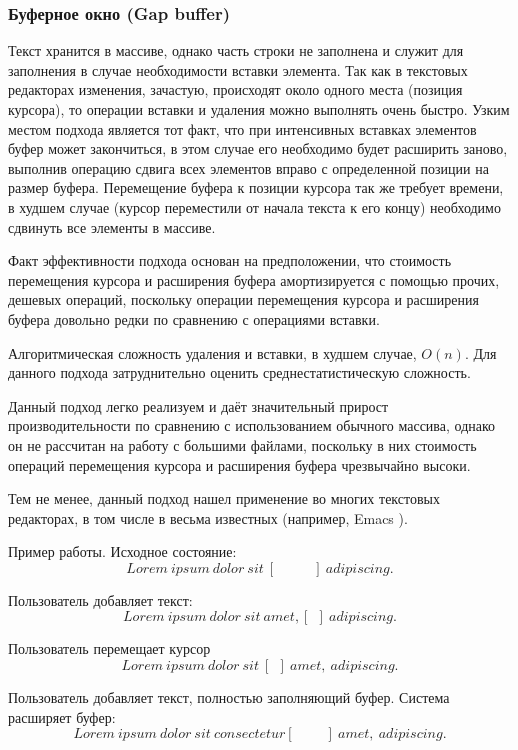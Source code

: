 \documentclass{fefu}
\begin{document}
			\subsubsection{Буферное окно (Gap buffer)}
				\par Текст хранится в массиве, однако часть строки не заполнена и служит для
				заполнения в случае необходимости вставки элемента. Так как в текстовых
				редакторах изменения, зачастую, происходят около одного места (позиция 
				курсора), то операции вставки и удаления можно выполнять очень быстро.
				Узким местом подхода является тот факт, что при интенсивных вставках элементов
				буфер может закончиться, в этом случае его необходимо будет расширить заново,
				выполнив операцию сдвига всех элементов вправо с определенной позиции на размер
				буфера. Перемещение буфера к позиции курсора так же требует времени, в худшем 
				случае (курсор переместили от начала текста к его концу) необходимо сдвинуть
				все элементы в массиве.
				\par Факт эффективности подхода основан на предположении, что стоимость
				перемещения курсора и расширения буфера амортизируется с помощью прочих,
				дешевых операций, поскольку операции перемещения курсора и расширения буфера
				довольно редки по сравнению с операциями вставки.
				\par Алгоритмическая сложность удаления и вставки, в худшем случае, $O(n)$. Для
				данного подхода затруднительно оценить среднестатистическую сложность.
				\par Данный подход легко реализуем и даёт значительный прирост
				производительности по сравнению с использованием обычного массива, однако он не
				рассчитан на работу с большими файлами, поскольку в них стоимость операций 
				перемещения курсора и расширения буфера чрезвычайно высоки.
				\par Тем не менее, данный подход нашел применение во многих текстовых
				редакторах, в том числе в весьма известных (например, Emacs
				\cite{EmacsGapBuffer}).
				\par Пример работы. Исходное состояние:
				$$Lorem~ipsum~dolor~sit~[~~~~~~~~~~~~]~adipiscing.$$
				\par Пользователь добавляет текст:
				$$Lorem~ipsum~dolor~sit~amet,[~~]~adipiscing.$$
				\par Пользователь перемещает курсор
				$$Lorem~ipsum~dolor~sit~[~~]~amet,~adipiscing.$$
				\par Пользователь добавляет текст, полностью заполняющий буфер. Система
				расширяет буфер:
				$$Lorem~ipsum~dolor~sit~consectetur[~~~~~~~~~~]~amet,~adipiscing.$$
\end{document}
